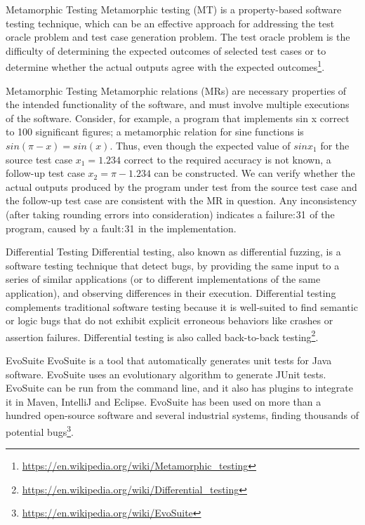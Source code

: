 \documentclass{beamer}
\begin{document}
\begin{frame}[t]{Metamorphic Testing}
Metamorphic testing (MT) is a property-based software testing technique, which can be an effective approach for addressing the test oracle problem and test case generation problem. The test oracle problem is the difficulty of determining the expected outcomes of selected test cases or to determine whether the actual outputs agree with the expected outcomes\footnote{\url{https://en.wikipedia.org/wiki/Metamorphic_testing}}.
\end{frame}

\begin{frame}[t]{Metamorphic Testing}
Metamorphic relations (MRs) are necessary properties of the intended functionality of the software, and must involve multiple executions of the software. Consider, for example, a program that implements sin x correct to 100 significant figures; a metamorphic relation for sine functions is $sin (\pi − x) = sin(x)$. Thus, even though the expected value of $sin x_1$ for the source test case $x_1 = 1.234$ correct to the required accuracy is not known, a follow-up test case $x_2 = \pi − 1.234$ can be constructed. We can verify whether the actual outputs produced by the program under test from the source test case and the follow-up test case are consistent with the MR in question. Any inconsistency (after taking rounding errors into consideration) indicates a failure: 31  of the program, caused by a fault: 31  in the implementation.
\end{frame}
\begin{frame}[t]{Differential Testing}
    Differential testing, also known as differential fuzzing, is a software testing technique that detect bugs, by providing the same input to a series of similar applications (or to different implementations of the same application), and observing differences in their execution. Differential testing complements traditional software testing because it is well-suited to find semantic or logic bugs that do not exhibit explicit erroneous behaviors like crashes or assertion failures. Differential testing is also called back-to-back testing\footnote{\url{https://en.wikipedia.org/wiki/Differential_testing}}.
\end{frame}

\begin{frame}[t]{EvoSuite}
    EvoSuite is a tool that automatically generates unit tests for Java software. EvoSuite uses an evolutionary algorithm to generate JUnit tests. EvoSuite can be run from the command line, and it also has plugins to integrate it in Maven, IntelliJ and Eclipse. EvoSuite has been used on more than a hundred open-source software and several industrial systems, finding thousands of potential bugs\footnote{\url{https://en.wikipedia.org/wiki/EvoSuite}}.
\end{frame}
\end{document}
